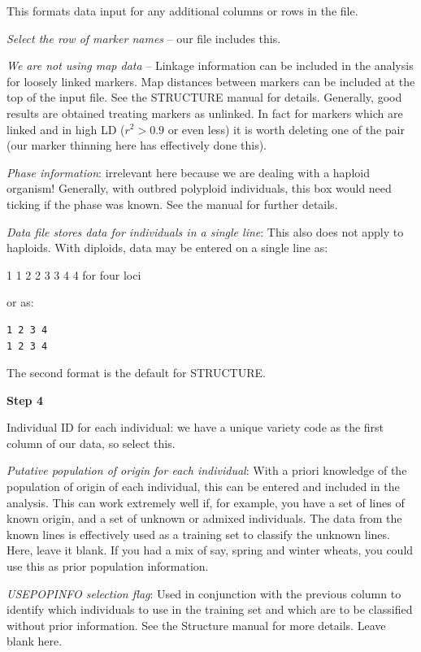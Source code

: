 \documentclass[
]{book}
\begin{document}
This formats data input for any additional columns or rows in the file.

\emph{Select the row of marker names} -- our file includes this.

\emph{We are not using map data} -- Linkage information can be included in the analysis for loosely linked markers. Map distances between markers can be included at the top of the input file. See the STRUCTURE manual for details. Generally, good results are obtained treating markers as unlinked. In fact for markers which are linked and in high LD (\(r^2>0.9\) or even less) it is worth deleting one of the pair (our marker thinning here has effectively done this).

\emph{Phase information}: irrelevant here because we are dealing with a haploid organism! Generally, with outbred polyploid individuals, this box would need ticking if the phase was known. See the manual for further details.

\emph{Data file stores data for individuals in a single line}: This also does not apply to haploids. With diploids, data may be entered on a single line as:

1 1 2 2 3 3 4 4 for four loci

or as:

\begin{verbatim}
1 2 3 4 
1 2 3 4 
\end{verbatim}

The second format is the default for STRUCTURE.

\textbf{Step 4}

Individual ID for each individual: we have a unique variety code as the first column of our data, so select this.

\emph{Putative population of origin for each individual}: With a priori knowledge of the population of origin of each individual, this can be entered and included in the analysis. This can work extremely well if, for example, you have a set of lines of known origin, and a set of unknown or admixed individuals. The data from the known lines is effectively used as a training set to classify the unknown lines. Here, leave it blank. If you had a mix of say, spring and winter wheats, you could use this as prior population information.

\emph{USEPOPINFO selection flag}: Used in conjunction with the previous column to identify which individuals to use in the training set and which are to be classified without prior information. See the Structure manual for more details. Leave blank here.
\end{document}
